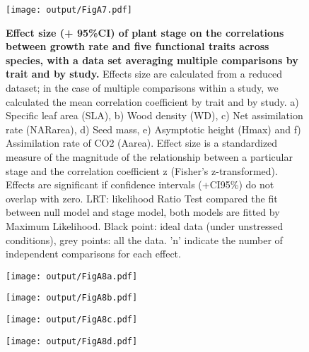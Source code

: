 \documentclass[a4paper]{article}\usepackage[]{graphicx}\usepackage[]{color}
\begin{document}
\begin{appendices}
\begin{figure}[htbp]
\centering
\texttt{[image: output/FigA7.pdf]}
\caption{\textbf{Effect size (+ 95\%CI) of plant stage on the correlations between growth rate and five functional traits across species, with a data set averaging multiple comparisons by trait and by study.} Effects size are calculated from a reduced dataset; in the case of multiple comparisons within a study, we calculated the mean correlation coefficient by trait and by study. a) Specific leaf area (SLA), b) Wood density (WD), c) Net assimilation rate (NARarea), d) Seed mass, e) Asymptotic height (Hmax) and f) Assimilation rate of CO2 (Aarea). Effect size is a standardized measure of the magnitude of the relationship between a particular stage and the correlation coefficient z (Fisher's z-transformed). Effects are significant if confidence intervals (+CI95\%) do not overlap with zero. LRT: likelihood Ratio Test compared the fit between null model and stage model, both models are fitted by Maximum Likelihood. Black point: ideal data (under unstressed conditions), grey points: all the data. 'n' indicate the number of independent comparisons for each effect.}
\label{FigA7}
\end{figure}



\begin{figure}[htbp]
\centering
\texttt{[image: output/FigA8a.pdf]}
\end{figure}

\begin{figure}[htbp]
\centering
\texttt{[image: output/FigA8b.pdf]}
\end{figure}

\begin{figure}[htbp]
\centering
\texttt{[image: output/FigA8c.pdf]}
\end{figure}

\begin{figure}[htbp]
\texttt{[image: output/FigA8d.pdf]}
\centering
\end{figure}


\end{appendices}
\end{document}
